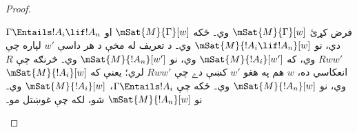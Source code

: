 \documentclass[../../../include/open-logic-section]{subfiles}
\begin{document}
\begin{proof}
\begin{enumerate}
    فرض کړئ $\mSat{M}{\Gamma}[w]$ وي۔ ځکه
    $\mSat{M}{\Gamma}[w]$ او $\Gamma \Entails !A_i \lif !A_n$
    دي، نو $\mSat{M}{!A_i \lif !A_n}[w]$ وي۔ د تعريف له مخې
    د هر داسې $w'$ لپاره چې $Rww'$ وي، که
    $\mSat{M}{!A_i}[w']$ وي، نو $\mSat{M}{!A_n}[w']$ وي۔
    څرنګه چې $R$ انعکاسي ده، $w$ هم په هغو $w'$ کښې دے چې
    $Rww'$ لري؛ يعنې که $\mSat{M}{!A_i}[w]$ وي، نو
    $\mSat{M}{!A_n}[w]$ وي۔ ځکه چې $\Gamma \Entails !A_i$،
    $\mSat{M}{!A_i}[w]$ وي۔ نو $\mSat{M}{!A_n}[w]$ شو،
    لکه چې غوښتل مو۔
  \end{enumerate}
\end{proof}
\end{document}
